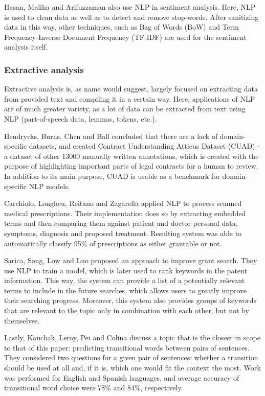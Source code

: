 \documentclass[conference]{IEEEtran}
\begin{document}
Hasan, Maliha and Arifuzzaman \cite{lr-6} also use NLP in sentiment analysis. Here, NLP is used to clean data as well as to detect and remove stop-words. After sanitizing data in this way, other techniques, such as Bag of Words (BoW) and Term Frequency-Inverse Document Frequency (TF-IDF) are used for the sentiment analysis itself.

\subsubsection{Extractive analysis}
Extractive analysis is, as name would suggest, largely focused on extracting data from provided text and compiling it in a certain way. Here, applications of NLP are of much greater variety, as a lot of data can be extracted from text using NLP (part-of-speech data, lemmas, tokens, etc.).

Hendrycks, Burns, Chen and Ball \cite{lr-7} concluded that there are a lack of domain-specific datasets, and created Contract Understanding Atticus Dataset (CUAD) - a dataset of other 13000 manually written annotations, which is created with the purpose of highlighting important parts of legal contracts for a human to review. In addition to its main purpose, CUAD is usable as a benchmark for domain-specific NLP models.

Carchiolo, Longheu, Reitano and Zagarella \cite{lr-8} applied NLP to process scanned medical prescriptions. Their implementation does so by extracting embedded terms and then comparing them against patient and doctor personal data, symptoms, diagnosis and proposed treatment. Resulting system was able to automatically classify 95\% of prescriptions as either grantable or not.

Sarica, Song, Low and Luo \cite{lr-9} proposed an approach to improve grant search. They use NLP to train a model, which is later used to rank keywords in the patent information. This way, the system can provide a list of a potentially relevant terms to include in the future searches, which allows users to greatly improve their searching progress. Moreover, this system also provides groups of keywords that are relevant to the topic only in combination with each other, but not by themselves.

Lastly, Kauchak, Leroy, Pei and Colina \cite{lr-10} discuss a topic that is the closest in scope to that of this paper: predicting transitional words between pairs of sentences. They considered two questions for a given pair of sentences: whether a transition should be used at all and, if it is, which one would fit the context the most. Work was performed for English and Spanish languages, and average accuracy of transitional word choice were 78\% and 84\%, respectively.
\end{document}
